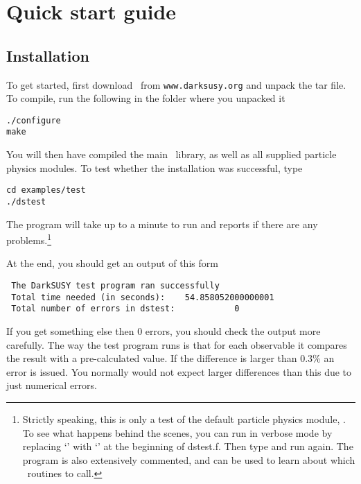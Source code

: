\chapter{Quick start guide}

\section{Installation}
To get started, first download \ds\ from {\tt www.darksusy.org} and unpack the tar file. To compile, run the
following in the folder where you unpacked it

\begin{verbatim}
./configure
make
\end{verbatim}

You will then have compiled the main \ds\  library, as well as all supplied particle physics 
modules. To test whether the installation was successful, type

\begin{verbatim}
cd examples/test
./dstest
\end{verbatim}

The program will take up to a minute to run and reports if there are any problems.\footnote{
Strictly speaking, this is only a test of the default particle physics module, .
To see what happens behind the scenes, you can run in verbose mode by 
replacing `' with  `' at the beginning of dstest.f. Then type  and run  again.
The program is also extensively commented, and can be used to learn about which \ds\ routines to call.
}

At the end, you should get an output of this form

\begin{verbatim}
 The DarkSUSY test program ran successfully
 Total time needed (in seconds):    54.858052000000001     
 Total number of errors in dstest:            0
\end{verbatim}

If you get something else then 0 errors, you should check the output more carefully. The way the test program runs is that for each observable it compares the result with a pre-calculated value. If the difference is larger than 0.3\% an error is issued. You normally would not expect larger differences than this due to just numerical errors.

